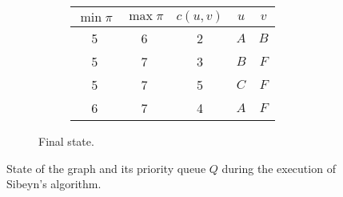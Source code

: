 \begin{figure}
  \vspace{1em}%
  \begin{subfigure}{\linewidth}
    \hspace{0.1\linewidth}%
    \begin{subfigure}[m]{0.4\linewidth}
      \centering
      \begin{tabular}{|c|c|c|c|c|}
        \hline
        $\min\pi$ & $\max\pi$ & $c(u,v)$ & $u$ & $v$ \\ \hline\hline
        5 & 6 & 2 & $A$ & $B$ \\ \hline
        5 & 7 & 3 & $B$ & $F$ \\ \hline
        5 & 7 & 5 & $C$ & $F$ \\ \hline
        6 & 7 & 4 & $A$ & $F$ \\ \hline
      \end{tabular}
    \end{subfigure}%
    \begin{subfigure}[m]{0.4\linewidth}
      \centering
    \end{subfigure}%
    \hspace{0.1\linewidth}

    \caption{Final state.}
    \label{fig:sibeyn6}

  \end{subfigure}

  \caption{State of the graph and its priority queue $Q$ during the execution of
  Sibeyn's algorithm.}

  \label{fig:sibeyn}
\end{figure}
